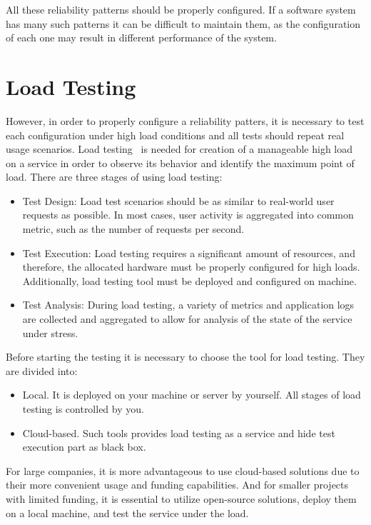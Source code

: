 All these reliability patterns should be properly configured. If a software system has many such patterns it can be difficult to maintain them, as the configuration of each one may result in different performance of the system.

\section{Load Testing}\label{sec:load-testing}
However, in order to properly configure a reliability patters, it is necessary to test each configuration under high load conditions and all tests should repeat real usage scenarios. Load testing~\cite{load_testing_wiki} is needed for creation of a manageable high load on a service in order to observe its behavior and identify the maximum point of load. There are three stages of using load testing:

\begin{itemize}
\item Test Design: Load test scenarios should be as similar to real-world user requests as possible. In most cases, user activity is aggregated into common metric, such as the number of requests per second.
\item Test Execution: Load testing requires a significant amount of resources, and therefore, the allocated hardware must be properly configured for high loads. Additionally, load testing tool must be deployed and configured on machine.
\item Test Analysis: During load testing, a variety of metrics and application logs are collected and aggregated to allow for analysis of the state of the service under stress.
\end{itemize}

Before starting the testing it is necessary to choose the tool for load testing. They are divided into:
\begin{itemize}
\item Local. It is deployed on your machine or server by yourself. All stages of load testing is controlled by you.
\item Cloud-based. Such tools provides load testing as a service and hide test execution part as black box.
\end{itemize}

For large companies, it is more advantageous to use cloud-based solutions due to their more convenient usage and funding capabilities.
And for smaller projects with limited funding, it is essential to utilize open-source solutions, deploy them on a local machine, and test the service under the load.

